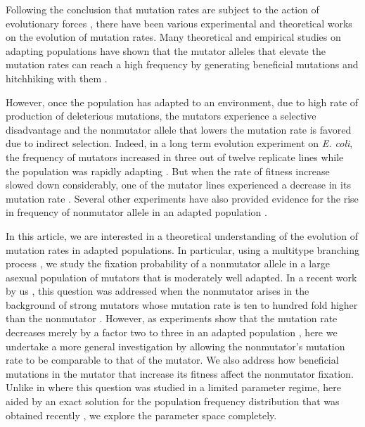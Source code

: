 \documentclass[preprint,12pt,number]{elsarticle}
\begin{document}
Following the conclusion that  mutation rates are subject to the action of evolutionary forces \citep{Sturtevant:1937}, there have been various experimental \citep{Chao:1983,Trobner:1984,Sniegowski:1997,Giraud:2001,Notleymcrobb:2002,Lynch:2010b,Sung:2012,Mcdonald:2012,Wielgoss:2013,Singh:2017} and theoretical \citep{Kimura:1967,Leigh:1973,Taddei:1997,Tenaillon:1999,Johnson:1999a,Palmer:2006,Wylie:2009,Sniegowski:2010,Lynch:2011,Desai:2011,Jain:2013,James:2016,James:2016b,Good:2016} works on the evolution of mutation rates. Many theoretical and empirical studies on adapting populations \citep{Raynes:2014}  have shown that the mutator alleles that elevate the mutation rates can reach a high frequency by generating beneficial mutations and hitchhiking with them \citep{Smith:1974}.

However, once the population has adapted to an environment, due to high rate of production of deleterious mutations, the mutators experience a selective disadvantage and the nonmutator allele that lowers the mutation rate is favored due to indirect selection. Indeed, in a long term evolution experiment on \textit{E. coli}, the frequency of mutators increased in three out of twelve replicate lines while the population was rapidly adapting \citep{Sniegowski:1997}. But when the rate of fitness increase slowed down considerably, one of the mutator lines experienced a decrease in its mutation rate \citep{Wielgoss:2013}. Several other experiments  have also provided evidence for the rise in frequency of nonmutator allele in an adapted population \citep{Trobner:1984,Notleymcrobb:2002,Mcdonald:2012,Singh:2017}.

In this article, we are interested in a theoretical understanding of the evolution of mutation rates in adapted populations. In particular, using a multitype branching process \citep{Harris:1963,Patwa:2008}, we study the fixation probability of a nonmutator allele in a large asexual population of mutators that is moderately well adapted.  In a recent work by us \citep{James:2016}, this question was addressed when the nonmutator arises in the background of strong mutators whose mutation rate is ten to hundred fold higher than the nonmutator \citep{Sniegowski:1997,Oliver:2000}.  However, as experiments show that the mutation rate decreases merely by a factor two to three in an adapted population \citep{Mcdonald:2012,Wielgoss:2013}, here we undertake a more general investigation by allowing the nonmutator's mutation rate to be comparable to that of the mutator. We also address how beneficial mutations in the mutator that increase its fitness affect the nonmutator fixation. Unlike in \citep{James:2016} where this question was studied in a limited parameter regime, here aided by an exact solution for the population frequency distribution that was obtained recently \citep{Jain:2016}, we explore the parameter space completely. 
\end{document}
